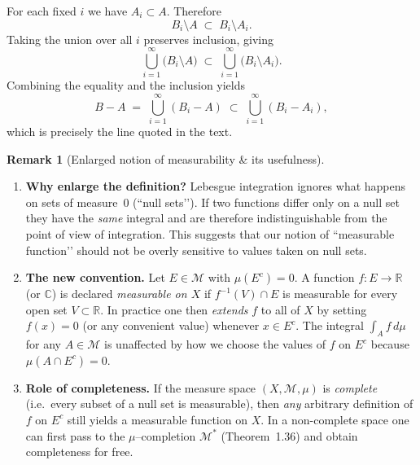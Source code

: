 \documentclass[12pt]{article}
\theoremstyle{definition} %
\newtheorem{remark}{Remark}
\theoremstyle{plain} %
\begin{document}
For each fixed \(i\) we have \(A_i\subset A\).  
Therefore
\[
    B_i\setminus A
    \;\subset\;
    B_i\setminus A_i.
\]
Taking the union over all \(i\) preserves inclusion, giving
\[
    \bigcup_{i=1}^{\infty}\bigl(B_i\setminus A\bigr)
    \;\subset\;
    \bigcup_{i=1}^{\infty}\bigl(B_i\setminus A_i\bigr).
\]
Combining the equality and the inclusion yields
\[
    B - A
    \;=\;
    \bigcup_{i=1}^{\infty}(B_i - A)
    \;\subset\;
    \bigcup_{i=1}^{\infty}(B_i - A_i),
\]
which is precisely the line quoted in the text.
\pagebreak
\begin{remark}[Enlarged notion of measurability \& its usefulness]
  \mbox{}\\[-0.8\baselineskip]
  \begin{enumerate}
      \item \textbf{Why enlarge the definition?}  
            Lebesgue integration ignores what happens on sets of measure~$0$
            (``null sets’’).  
            If two functions differ only on a null set they have the \emph{same} integral
            and are therefore indistinguishable from the point of view of integration.
            This suggests that our notion of ``measurable function’’ should not be
            overly sensitive to values taken on null sets.

      \item \textbf{The new convention.}  
            Let \(E\in\mathcal{M}\) with \(\mu(E^{c})=0\).  
            A function \(f:E\to\mathbb{R}\) (or \(\mathbb{C}\)) is declared 
            \emph{measurable on \(X\)} if
            \(
                f^{-1}(V)\cap E
            \) is measurable for every open set \(V\subset\mathbb{R}\).
            In practice one then \emph{extends} \(f\) to all of \(X\) by setting
            \(
                f(x)=0
            \)
            (or any convenient value) whenever \(x\in E^{c}\).
            The integral
            \(
                \displaystyle\int_{A}f\,d\mu
            \)
            for any \(A\in\mathcal{M}\) is unaffected by how we choose the
            values of \(f\) on \(E^{c}\) because \(\mu(A\cap E^{c})=0\).

      \item \textbf{Role of completeness.}  
            If the measure space \((X,\mathcal{M},\mu)\) is \emph{complete}
            (i.e.\ every subset of a null set is measurable),
            then \emph{any} arbitrary definition of \(f\) on \(E^{c}\)
            still yields a measurable function on \(X\).
            In a non-complete space one can first pass to the
            \(\mu\)\nobreakdash–completion \(\mathcal{M}^{*}\) (Theorem~1.36) and obtain
            completeness for free.


\end{enumerate}
\end{remark}
\end{document}
